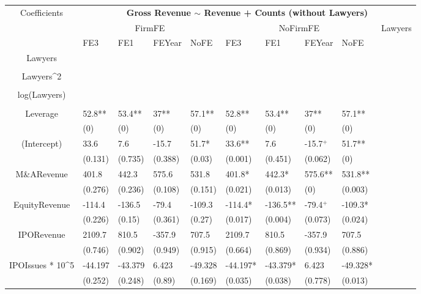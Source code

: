 \documentclass{article}
\begin{document}
\begin{table}[H]
\centering
\begin{tabular}{|clllllllll|}
\hline
\multirow{3}{*}{Coefficients} & \multicolumn{9}{c|}{\textbf{Gross Revenue $\sim$ Revenue + Counts (without Lawyers)}} \\
\cline{2-10}
& \multicolumn{4}{c}{FirmFE} & \multicolumn{4}{c}{NoFirmFE} & \multirow{2}{*}{Lawyers} \\
\cline{2-9}
& FE3 & FE1 & FEYear & NoFE & FE3 & FE1 & FEYear & NoFE &  \\
\hline
 
Lawyers &  &  &  &  &  &  &  &  & \\ 
   &  &  &  &  &  &  &  &  & \\ 
  Lawyers^2 &  &  &  &  &  &  &  &  & \\ 
   &  &  &  &  &  &  &  &  & \\ 
  log(Lawyers) &  &  &  &  &  &  &  &  & \\ 
   &  &  &  &  &  &  &  &  & \\ 
  Leverage & 52.8** & 53.4** & 37** & 57.1** & 52.8** & 53.4** & 37** & 57.1** & \\ 
   & (0) & (0) & (0) & (0) & (0) & (0) & (0) & (0) & \\ 
  (Intercept) & 33.6 & 7.6 & -15.7 & 51.7* & 33.6** & 7.6 & -15.7$^{+}$ & 51.7** & \\ 
   & (0.131) & (0.735) & (0.388) & (0.03) & (0.001) & (0.451) & (0.062) & (0) & \\ 
  M\&ARevenue & 401.8 & 442.3 & 575.6 & 531.8 & 401.8* & 442.3* & 575.6** & 531.8** & \\ 
   & (0.276) & (0.236) & (0.108) & (0.151) & (0.021) & (0.013) & (0) & (0.003) & \\ 
  EquityRevenue & -114.4 & -136.5 & -79.4 & -109.3 & -114.4* & -136.5** & -79.4$^{+}$ & -109.3* & \\ 
   & (0.226) & (0.15) & (0.361) & (0.27) & (0.017) & (0.004) & (0.073) & (0.024) & \\ 
  IPORevenue & 2109.7 & 810.5 & -357.9 & 707.5 & 2109.7 & 810.5 & -357.9 & 707.5 & \\ 
   & (0.746) & (0.902) & (0.949) & (0.915) & (0.664) & (0.869) & (0.934) & (0.886) & \\ 
  IPOIssues * 10^5 & -44.197 & -43.379 & 6.423 & -49.328 & -44.197* & -43.379* & 6.423 & -49.328* & \\ 
   & (0.252) & (0.248) & (0.89) & (0.169) & (0.035) & (0.038) & (0.778) & (0.013) & \\ 

\end{tabular}
\end{table}
\end{document}
